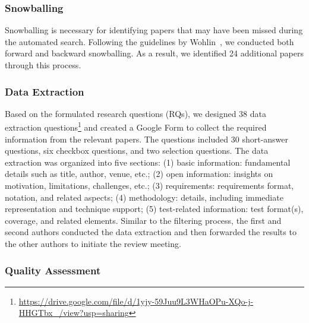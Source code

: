 \subsubsection{Snowballing}

Snowballing is necessary for identifying papers that may have been missed during the automated search. Following the guidelines by Wohlin~\cite{wohlin2014guidelines}, we conducted both forward and backward snowballing. As a result, we identified 24 additional papers through this process.

\subsubsection{Data Extraction}

Based on the formulated research questions (RQs), we designed 38 data extraction questions\footnote{\url{https://drive.google.com/file/d/1yjy-59Juu9L3WHaOPu-XQo-j-HHGTbx_/view?usp=sharing}} and created a Google Form to collect the required information from the relevant papers. The questions included 30 short-answer questions, six checkbox questions, and two selection questions. The data extraction was organized into five sections: (1) basic information: fundamental details such as title, author, venue, etc.; (2) open information: insights on motivation, limitations, challenges, etc.; (3) requirements: requirements format, notation, and related aspects; (4) methodology: details, including immediate representation and technique support; (5) test-related information: test format(s), coverage, and related elements. Similar to the filtering process, the first and second authors conducted the data extraction and then forwarded the results to the other authors to initiate the review meeting.

\subsubsection{Quality Assessment}

